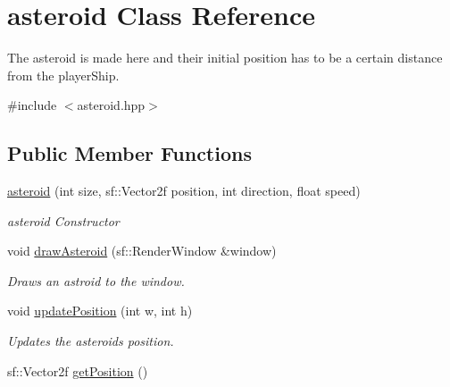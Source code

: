 \hypertarget{classasteroid}{}\section{asteroid Class Reference}
\label{classasteroid}


The asteroid is made here and their initial position has to be a certain distance from the player\+Ship.  




{\ttfamily \#include $<$asteroid.\+hpp$>$}

\subsection*{Public Member Functions}
\begin{DoxyCompactItemize}
\item 
\mbox{\label{classasteroid_abd05f8b7b015337cbc90d45f2978ec32}} 
\hyperlink{classasteroid_abd05f8b7b015337cbc90d45f2978ec32}{asteroid} (int size, sf\+::\+Vector2f position, int direction, float speed)
\begin{DoxyCompactList}\small\item\em asteroid Constructor \end{DoxyCompactList}\item 
\mbox{\label{classasteroid_afe134ee768ec3b90085ceee3f51f4afa}} 
void \hyperlink{classasteroid_afe134ee768ec3b90085ceee3f51f4afa}{draw\+Asteroid} (sf\+::\+Render\+Window \&window)
\begin{DoxyCompactList}\small\item\em Draws an astroid to the window. \end{DoxyCompactList}\item 
\mbox{\label{classasteroid_aab9fb02b075792ddcf5234853c5fe76a}} 
void \hyperlink{classasteroid_aab9fb02b075792ddcf5234853c5fe76a}{update\+Position} (int w, int h)
\begin{DoxyCompactList}\small\item\em Updates the asteroid\textquotesingle{}s position. \end{DoxyCompactList}\item 
\mbox{\label{classasteroid_a01aa09ce14b12379bf4e521912f00745}} 
sf\+::\+Vector2f \hyperlink{classasteroid_a01aa09ce14b12379bf4e521912f00745}{get\+Position} ()

\end{DoxyCompactItemize}
